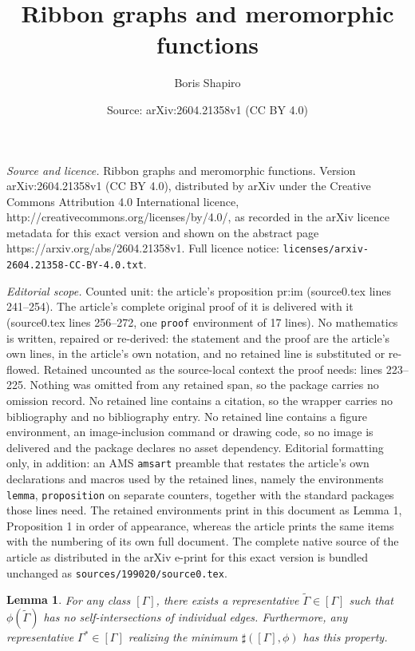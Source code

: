 \documentclass[10pt,a4paper]{amsart}
\title{Ribbon graphs and meromorphic functions}
\author{Boris Shapiro}
\date{Source: arXiv:2604.21358v1 (CC BY 4.0)}
\newtheorem{lemma}{Lemma}
\newcommand {\Ga}{\Gamma}
\begin{document}
\maketitle

\noindent\emph{Source and licence.} Ribbon graphs and meromorphic functions. Version arXiv:2604.21358v1 (CC BY 4.0), distributed by arXiv under the Creative Commons Attribution 4.0 International licence, http://creativecommons.org/licenses/by/4.0/, as recorded in the arXiv licence metadata for this exact version and shown on the abstract page https://arxiv.org/abs/2604.21358v1. Full licence notice: \texttt{licenses/arxiv-2604.21358-CC-BY-4.0.txt}.\par\smallskip

\noindent\textit{Editorial scope.} Counted unit: the article's proposition pr:im (source0.tex lines 241--254). The article's complete original proof of it is delivered with it (source0.tex lines 256--272, one \texttt{proof} environment of 17 lines). No mathematics is written, repaired or re-derived: the statement and the proof are the article's own lines, in the article's own notation, and no retained line is substituted or re-flowed.  Retained uncounted as the source-local context the proof needs: lines 223--225.  Nothing was omitted from any retained span, so the package carries no omission record.  No retained line contains a citation, so the wrapper carries no bibliography and no bibliography entry.  No retained line contains a figure environment, an image-inclusion command or drawing code, so no image is delivered and the package declares no asset dependency.  Editorial formatting only, in addition: an AMS \texttt{amsart} preamble that restates the article's own declarations and macros used by the retained lines, namely the environments \texttt{lemma}, \texttt{proposition} on separate counters, together with the standard packages those lines need.  The retained environments print in this document as Lemma 1, Proposition 1 in order of appearance, whereas the article prints the same items with the numbering of its own full document.  The complete native source of the article as distributed in the arXiv e-print for this exact version is bundled unchanged as \texttt{sources/199020/source0.tex}.
\begin{lemma}\label{lm:noselfint}
For any class $[\Ga]$, there exists a representative $\widetilde \Ga\in[\Ga]$ such that $\phi(\widetilde \Ga)$ has no self-intersections of individual edges. Furthermore, any representative $\Ga^*\in[\Ga]$ realizing the minimum $\sharp([\Ga],\phi)$ has this property.
\end{lemma}
\end{document}
